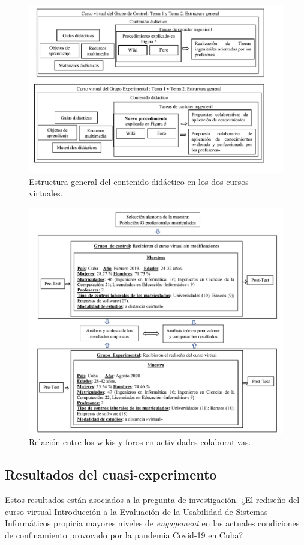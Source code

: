 \documentclass[spanish]{textolivre}
\begin{document}
\begin{figure}[htbp]
 \centering
 \includegraphics[width=1\textwidth]{fig4.png}
 \caption{Estructura general del contenido didáctico en los dos cursos virtuales.}
 \label{fig4}
\end{figure}

\begin{figure}[htbp]
 \centering
 \includegraphics[width=1\textwidth]{fig5.png}
 \caption{Relación entre los wikis y foros en actividades colaborativas.}
 \label{fig5}
\end{figure}

\subsection{Resultados del cuasi-experimento}
Estos resultados están asociados a la pregunta de investigación. ¿El rediseño del curso virtual Introducción a la Evaluación de la Usabilidad de Sistemas Informáticos propicia mayores niveles de \emph{engagement} en las actuales condiciones de confinamiento provocado por la pandemia Covid-19 en Cuba?
\end{document}
